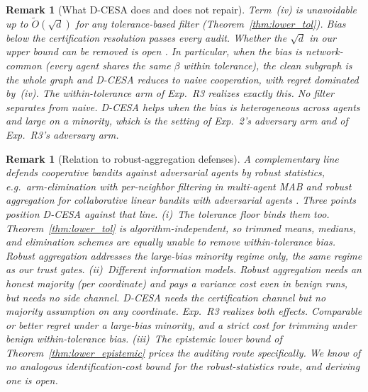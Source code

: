 \documentclass[11pt]{article}
\newtheorem{remark}[theorem]{Remark}
\newcommand{\Ot}{\widetilde{O}}
\begin{document}
\begin{remark}[What D-CESA does and does not repair]\label{rem:dcesa_scope}
Term~(iv) is unavoidable up to $\Ot(\sqrt d)$ for any
tolerance-based filter (Theorem~\ref{thm:lower_tol}). Bias below the
certification resolution passes every audit. Whether the $\sqrt d$ in
our upper bound can be removed is open \citep{lattimore2020}.  In
particular, when the bias is
\emph{network-common} (every agent shares the same $\beta$ within
tolerance), the clean subgraph is the whole graph and D-CESA reduces to
naive cooperation, with regret dominated by~(iv). The within-tolerance
arm of Exp.~R3 realizes exactly this. No filter separates from naive.
D-CESA helps when the bias is \emph{heterogeneous across agents} and
large on a minority, which is the setting of Exp.~2's adversary arm
and of Exp.~R3's adversary arm.
\end{remark}

\begin{remark}[Relation to robust-aggregation defenses]
\label{rem:robust_agg}
A complementary line defends cooperative bandits against adversarial
agents by robust statistics, e.g.\ arm-elimination with
per-neighbor filtering in multi-agent MAB \citep{vial2021} and robust
aggregation for collaborative linear bandits with adversarial agents
\citep{mitra2022}.  Three points position D-CESA against that line.
(i)~\emph{The tolerance floor binds them too}. Theorem~\ref{thm:lower_tol} is algorithm-independent, so trimmed
means, medians, and elimination schemes are equally unable to remove
within-tolerance bias. Robust aggregation addresses the large-bias
minority regime only, the same regime as our trust gates.
(ii)~\emph{Different information models}. Robust aggregation needs an
honest majority (per coordinate) and pays a variance cost even in
benign runs, but needs no side channel. D-CESA needs the certification
channel but no majority assumption on any coordinate.  Exp.~R3
realizes both effects. Comparable or better regret
under a large-bias minority, and a strict cost for trimming under
benign within-tolerance bias.  (iii)~The epistemic lower bound of
Theorem~\ref{thm:lower_epistemic} prices the \emph{auditing} route
specifically. We know of no analogous identification-cost bound for
the robust-statistics route, and deriving one is open.
\end{remark}
\end{document}
